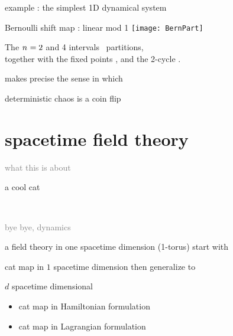 \begin{frame}{example : the simplest 1D dynamical system}
    \begin{block}{Bernoulli shift map : linear mod 1}
\texttt{[image: BernPart]}
    \end{block}

\bigskip

The ${n_{}}=2$ and 4 intervals \statesp\ partitions,
\\
together with the
fixed points ,  and the 2-cycle .
\bigskip

makes precise the sense in which

\hfill deterministic chaos is a coin flip
\end{frame}

\section[spacetime field theory]
 {spacetime field theory}
\label{spacetimeFT}

\begin{frame}{}
\begin{enumerate}
              \item \textcolor{gray}{\small
what this is about
                  }
              \item {\Large
a cool cat
                  }\textcolor{gray}{\small
              \item
\catlatt\
              \item
bye bye, dynamics
                    }
            \end{enumerate}
\end{frame}

\begin{frame}{a field theory in one spacetime dimension (1-torus)}
start with

\bigskip

\begin{block}{cat map in $1$ spacetime dimension}
then generalize to

\bigskip

$d$ spacetime dimensional {\Large \catlatt}
\end{block}

\vfill

\begin{itemize}
  \item cat map in Hamiltonian formulation
  \item cat map in Lagrangian formulation
\end{itemize}
\end{frame}

